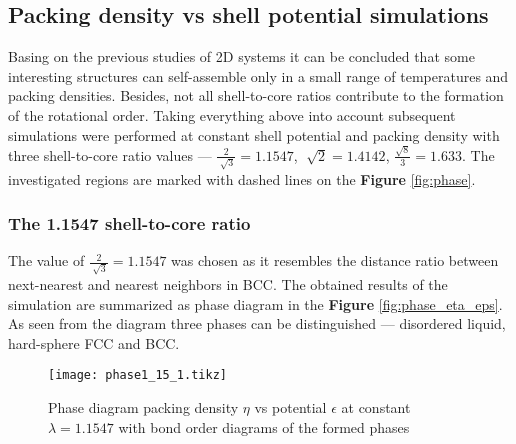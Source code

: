 \subsection{Packing density vs shell potential simulations}

Basing on the previous studies of 2D systems\cite{stability,stability2} it can be concluded that
some interesting structures can self-assemble only in a small range of temperatures and packing densities. Besides, not all shell-to-core ratios contribute to the formation of the rotational order. Taking everything above into account subsequent simulations were performed at constant shell potential and packing density with three shell-to-core ratio values --- $\frac{2}{\sqrt[]{3}}=1.1547$, $\sqrt[]{2}=1.4142$, $\frac{\sqrt{8}}{3}=1.633$. The investigated regions are marked with dashed lines on the \textbf{Figure} \ref{fig:phase}. 

\subsubsection{The 1.1547 shell-to-core ratio}

The value of $\frac{2}{\sqrt[]{3}}=1.1547$ was chosen as it resembles the distance ratio between next-nearest and nearest neighbors in BCC.
The obtained results of the simulation are summarized as phase diagram in the \textbf{Figure} \ref{fig:phase_eta_eps}. As seen from the diagram three phases can be distinguished --- disordered liquid, hard-sphere FCC and BCC. 

\begin{figure}
\centering
\texttt{[image: phase1\_15\_1.tikz]}
\caption{Phase diagram packing density $\eta$ vs potential $\epsilon$ at constant $\lambda=1.1547$ with bond order diagrams of the formed phases} \label{fig:phase_eta_epssmall}
\end{figure}

